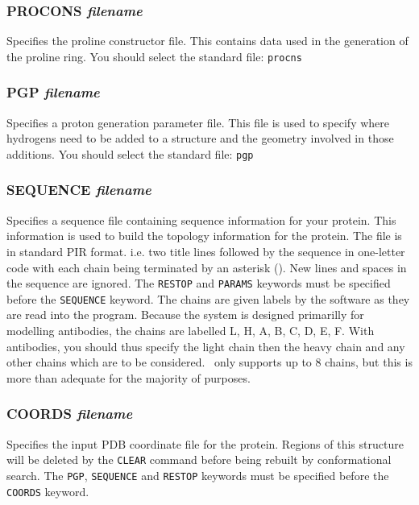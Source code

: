 \subsubsection{PROCONS {\em filename}}
\es
Specifies the proline constructor file. This contains data used in the
generation of the proline ring. You should select the standard file:
{\tt procns}

\subsubsection{PGP {\em filename}}
\es
Specifies a proton generation parameter file. This file is used to specify
where hydrogens need to be added to a structure and the geometry involved
in those additions. You should select the standard file: {\tt pgp}

\subsubsection{SEQUENCE {\em filename}}
\es
Specifies a sequence file containing sequence information for your protein.
This information is used to build the topology information for the protein.
The file is in standard PIR format. i.e. two title lines followed by the
sequence in one-letter code with each chain being terminated by an asterisk
({\tt *}). New lines and spaces in the sequence are ignored. The {\tt RESTOP}
and {\tt PARAMS} keywords must be specified before the {\tt SEQUENCE} keyword.
The chains are given labels by the software as they are read into the 
program. Because the system is designed primarilly for modelling antibodies,
the chains are labelled L, H, A, B, C, D, E, F. With antibodies, you should
thus specify the light chain then the heavy chain and any other chains
which are to be considered. \cs\ only supports up to
8 chains, but this is more than adequate for the majority of purposes.

\subsubsection{COORDS {\em filename}}
\label{sec:coords}
\es
Specifies the input PDB coordinate file for the protein. Regions of this
structure will be deleted by the {\tt CLEAR} command before being rebuilt by
conformational search. The {\tt PGP}, {\tt SEQUENCE} and {\tt RESTOP}
keywords must be specified before the {\tt COORDS} keyword.


